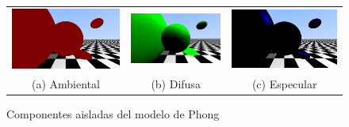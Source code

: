 \begin{figure}[ht]
    \centering
    \begin{tabular}{ccc}
      \includegraphics[scale=0.12]{img/C7/solo-ambiental.png} &   \includegraphics[scale=0.12]{img/C7/solo-difusa.png} &   \includegraphics[scale=0.12]{img/C7/solo-especular.png} \\
    (a) Ambiental & (b) Difusa & (c) Especular \\[6pt]
    \end{tabular}
    \caption{Componentes aisladas del modelo de Phong}
    \label{fig:componentes-aisladas}
\end{figure}

